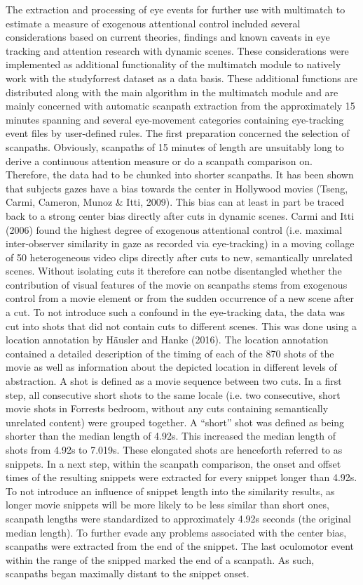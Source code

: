 \documentclass[a4paper, 11pt]{scrreprt}
\begin{document}
The extraction and processing of eye events for further use with multimatch to estimate a measure of exogenous attentional control included several considerations based on current theories, findings and known caveats in eye tracking and attention research with dynamic scenes. These considerations were implemented as additional functionality of the multimatch module to natively work with the studyforrest dataset as a data basis. These additional functions are distributed along with the main algorithm in the multimatch module and are mainly concerned with automatic scanpath extraction from the approximately 15 minutes spanning and several eye-movement categories containing eye-tracking event files by user-defined rules. The first preparation concerned the selection of scanpaths. Obviously, scanpaths of 15 minutes of length are unsuitably long to derive a continuous attention measure or do a scanpath comparison on. Therefore, the data had to be chunked into shorter scanpaths.  It has been shown that subjects gazes have a bias towards the center in Hollywood movies (Tseng, Carmi, Cameron, Munoz \& Itti, 2009). This bias can at least in part be traced back to a strong center bias directly after cuts in dynamic scenes. Carmi and Itti (2006) found the highest degree of exogenous attentional control (i.e. maximal inter-observer similarity in gaze as recorded via eye-tracking) in a moving collage of 50 heterogeneous video clips directly after cuts to new, semantically unrelated scenes. Without isolating cuts it therefore can notbe disentangled whether the contribution of visual features of the movie on scanpaths stems from exogenous control from a movie element or from the sudden occurrence of a new scene after a cut. To not introduce such a confound in the eye-tracking data, the data was cut into shots that did not contain cuts to different scenes. This was done using a location annotation by Häusler and Hanke (2016). The location annotation contained a detailed description of the timing of each of the 870 shots of the movie as well as information about the depicted location in different levels of abstraction. A shot is defined as a movie sequence between two cuts. In a first step, all consecutive short shots to the same locale (i.e. two consecutive, short movie shots in Forrests bedroom, without any cuts containing semantically unrelated content) were grouped together. A “short” shot was defined as being shorter than the median length of 4.92s. This increased the median length of shots from 4.92s to 7.019s. These elongated shots are henceforth referred to as snippets. In a next step, within the scanpath comparison, the onset and offset times of the resulting snippets were extracted for every snippet longer than 4.92s. To not introduce an influence of snippet length into the similarity results, as longer movie snippets will be more likely to be less similar than short ones, scanpath lengths were standardized to approximately 4.92s seconds (the original median length). To further evade any problems associated with the center bias, scanpaths were extracted from the end of the snippet. The last oculomotor event within the range of the snipped marked the end of a scanpath. As such, scanpaths began maximally distant to the snippet onset.
\end{document}
